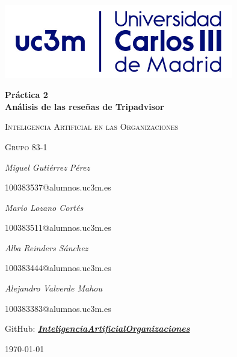 \documentclass[12pt,a4paper, xcolor=table]{article}
\begin{document}
\setlength{\parindent}{0pt}
\begin{titlepage}
        \centering
        \includegraphics[width=0.75\textwidth]{img/logo_uc3m.jpg}\par\vspace{2cm}
        {\huge\bfseries Práctica 2 \\ Análisis de las reseñas de Tripadvisor\par}
        \vspace{0.5cm}
        {\scshape\Large Inteligencia Artificial en las Organizaciones\par}
        \vspace{1.5cm}
        {\scshape\Large Grupo 83-1\par}
        \vspace{1.5cm}
        {\Large\itshape Miguel Gutiérrez Pérez\par}
        {\Large 100383537@alumnos.uc3m.es \par}
        \vspace{1cm}
        {\Large\itshape Mario Lozano Cortés\par}
        {\Large 100383511@alumnos.uc3m.es\par}
        \vspace{1cm}
        {\Large\itshape Alba Reinders Sánchez\par}
        {\Large 100383444@alumnos.uc3m.es\par}
        \vspace{1cm}
        {\Large\itshape Alejandro Valverde Mahou\par}
        {\Large 100383383@alumnos.uc3m.es\par}
        \vspace{5mm}
        {\large GitHub: \textbf{\textit{\href{https://github.com/Pheithar/InteligenciaArtificialOrganizaciones}{InteligenciaArtificialOrganizaciones}}}}
        \vfill

        {\large \today\par}
\end{titlepage}

\tableofcontents

\newpage
\end{document}
